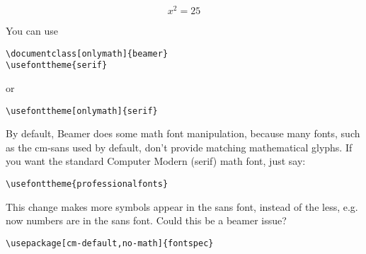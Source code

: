 \documentclass{beamer}
\begin{document}
  \begin{frame}
    \lipsum[1]
    \[x^2=25\]
  \end{frame}
  
You can use
\begin{verbatim}
\documentclass[onlymath]{beamer}
\usefonttheme{serif}
\end{verbatim} 
or 
\begin{verbatim}
\usefonttheme[onlymath]{serif}
\end{verbatim} 
  
  
By default, Beamer does some math font manipulation, because many
fonts, such as the cm-sans used by default, don't provide matching
mathematical glyphs. If you want the standard Computer Modern (serif)
math font, just say:

\begin{verbatim}
\usefonttheme{professionalfonts}
\end{verbatim}  


This change makes more symbols appear in the sans font, instead of the
less, e.g. now numbers are in the sans font. Could this be a beamer
issue? 
   
\begin{verbatim}
\usepackage[cm-default,no-math]{fontspec}
\end{verbatim} 
\end{document}
